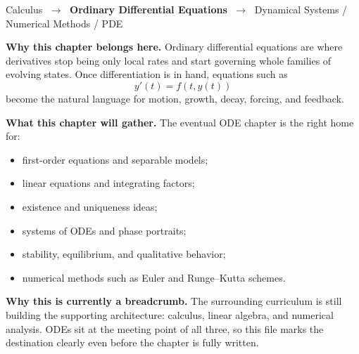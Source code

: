 
\begin{tcolorbox}[
  colback=gray!6,
  colframe=gray!40,
  arc=2pt,
  left=8pt, right=8pt, top=6pt, bottom=6pt,
  title={\small\textbf{Where This Chapter Lives}},
  fonttitle=\small\bfseries
]
\begin{center}
\small
Calculus
$\;\to\;$ \textbf{Ordinary Differential Equations}
$\;\to\;$ Dynamical Systems / Numerical Methods / PDE
\end{center}

\medskip
\noindent\textbf{Why this chapter belongs here.}
Ordinary differential equations are where derivatives stop being only local
rates and start governing whole families of evolving states.  Once
differentiation is in hand, equations such as
\[
y'(t)=f(t,y(t))
\]
become the natural language for motion, growth, decay, forcing, and
feedback.

\medskip
\noindent\textbf{What this chapter will gather.}
The eventual ODE chapter is the right home for:
\begin{itemize}
  \item first-order equations and separable models;
  \item linear equations and integrating factors;
  \item existence and uniqueness ideas;
  \item systems of ODEs and phase portraits;
  \item stability, equilibrium, and qualitative behavior;
  \item numerical methods such as Euler and Runge--Kutta schemes.
\end{itemize}

\medskip
\noindent\textbf{Why this is currently a breadcrumb.}
The surrounding curriculum is still building the supporting architecture:
calculus, linear algebra, and numerical analysis.  ODEs sit at
the meeting point of all three, so this file marks the destination clearly
even before the chapter is fully written.
\end{tcolorbox}
